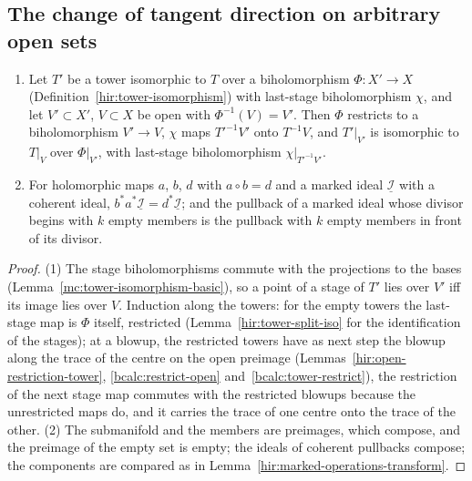 \subsection{The change of tangent direction on arbitrary open sets}

\begin{lemma}
\label{mc:tower-iso-opens}
\leanok
\begin{enumerate}
\item Let \(T'\) be a tower isomorphic to \(T\) over a biholomorphism \(\Phi\colon X'\to X\) (Definition~\ref{hir:tower-isomorphism}) with last-stage biholomorphism
\(\chi\), and let \(V'\subset X'\), \(V\subset X\) be open with \(\Phi^{-1}(V)=V'\). Then \(\Phi\) restricts to a biholomorphism \(V'\to V\), \(\chi\) maps
\(T'^{-1}V'\) onto \(T^{-1}V\), and \(T'|_{V'}\) is isomorphic to \(T|_V\) over \(\Phi|_{V'}\), with last-stage biholomorphism \(\chi|_{T'^{-1}V'}\).
\item For holomorphic maps \(a\), \(b\), \(d\) with \(a\circ b=d\) and a marked ideal \(\underline{\mathcal I}\) with a coherent ideal, \(b^*a^*\underline{\mathcal I}=d^*\underline{\mathcal I}\);
and the pullback of a marked ideal whose divisor begins with \(k\) empty members is the pullback with \(k\) empty members in front of its divisor.
\end{enumerate}
\end{lemma}
\begin{proof}
\leanok
(1) The stage biholomorphisms commute with the projections to the bases (Lemma~\ref{mc:tower-isomorphism-basic}), so a point of a stage of \(T'\) lies over \(V'\) iff
its image lies over \(V\). Induction along the towers: for the empty towers the last-stage map is \(\Phi\) itself, restricted (Lemma~\ref{hir:tower-split-iso} for the
identification of the stages); at a blowup, the restricted towers have as next step the blowup along the trace of the centre on the open preimage
(Lemmas~\ref{hir:open-restriction-tower}, \ref{bcalc:restrict-open} and~\ref{bcalc:tower-restrict}), the restriction of the next stage map commutes with the restricted
blowups because the unrestricted maps do, and it carries the trace of one centre onto the trace of the other.
(2) The submanifold and the members are preimages, which compose, and the preimage of the empty set is empty; the ideals of coherent pullbacks compose; the
components are compared as in Lemma~\ref{hir:marked-operations-transform}.
\end{proof}

